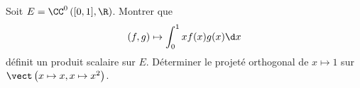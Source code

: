 \begin{enonce}
\begin{exercise}[ID={RMS 122-2 E1321 CCP PC},subtitle={},tags={mpsi},difficulty={}]
  Soit $E=\CC^0\left( [0,1],\R \right)$.
  Montrer que
  \begin{equation*}
    (f,g)\mapsto \int_0^1 x f(x) g(x) \d x
  \end{equation*}
  définit un produit scalaire sur $E$.
  Déterminer le projeté orthogonal de $x\mapsto 1$ sur $\vect\left( x\mapsto x, x\mapsto x^2 \right)$.
\end{exercise}
\begin{solution}
\end{solution}
\end{enonce}
